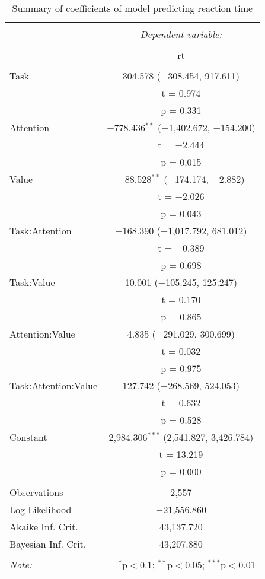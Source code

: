 
\begin{table}[!b] \centering 
  \caption{Summary of coefficients of model predicting reaction time} 
  \label{table:rtModel} 
\begin{tabular}{@{\extracolsep{5pt}}lc} 
\\[-1.8ex]\hline 
\hline \\[-1.8ex] 
 & \multicolumn{1}{c}{\textit{Dependent variable:}} \\ 
\cline{2-2} 
\\[-1.8ex] & rt \\ 
\hline \\[-1.8ex] 
 Task & 304.578 ($-$308.454, 917.611) \\ 
  & t = 0.974 \\ 
  & p = 0.331 \\ 
  Attention & $-$778.436$^{**}$ ($-$1,402.672, $-$154.200) \\ 
  & t = $-$2.444 \\ 
  & p = 0.015 \\ 
  Value & $-$88.528$^{**}$ ($-$174.174, $-$2.882) \\ 
  & t = $-$2.026 \\ 
  & p = 0.043 \\ 
  Task:Attention & $-$168.390 ($-$1,017.792, 681.012) \\ 
  & t = $-$0.389 \\ 
  & p = 0.698 \\ 
  Task:Value & 10.001 ($-$105.245, 125.247) \\ 
  & t = 0.170 \\ 
  & p = 0.865 \\ 
  Attention:Value & 4.835 ($-$291.029, 300.699) \\ 
  & t = 0.032 \\ 
  & p = 0.975 \\ 
  Task:Attention:Value & 127.742 ($-$268.569, 524.053) \\ 
  & t = 0.632 \\ 
  & p = 0.528 \\ 
  Constant & 2,984.306$^{***}$ (2,541.827, 3,426.784) \\ 
  & t = 13.219 \\ 
  & p = 0.000 \\ 
 \hline \\[-1.8ex] 
Observations & 2,557 \\ 
Log Likelihood & $-$21,556.860 \\ 
Akaike Inf. Crit. & 43,137.720 \\ 
Bayesian Inf. Crit. & 43,207.880 \\ 
\hline 
\hline \\[-1.8ex] 
\textit{Note:}  & \multicolumn{1}{r}{$^{*}$p$<$0.1; $^{**}$p$<$0.05; $^{***}$p$<$0.01} \\ 
\end{tabular} 
\end{table} 
